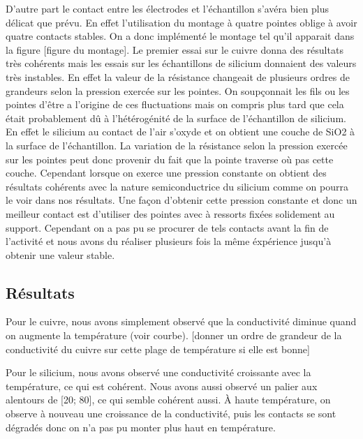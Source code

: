 D'autre part le contact entre les électrodes et l'échantillon s'avéra bien plus délicat que prévu. 
En effet l'utilisation du montage à quatre pointes oblige à avoir quatre contacts stables. On a donc implémenté 
le montage tel qu'il apparait dans la figure [figure du montage]. Le premier essai sur le cuivre donna des résultats 
très cohérents mais les essais sur les échantillons de silicium donnaient des valeurs très instables. 
En effet la valeur de la résistance changeait de plusieurs ordres de grandeurs selon la pression exercée sur les 
pointes. On soupçonnait les fils ou les pointes d'être a l'origine de ces fluctuations 
mais on compris plus tard que cela était probablement dû à l'hétérogénité de la surface de l'échantillon de silicium. 
En effet le silicium au contact de l'air s'oxyde et on obtient une couche de SiO2 à la surface de l'échantillon. 
La variation de la résistance selon la pression exercée sur les pointes peut donc provenir du fait que la pointe 
traverse où pas cette couche. Cependant lorsque on exerce une pression constante on obtient des résultats cohérents avec la nature semiconductrice du silicium comme on pourra le voir dans nos résultats. Une façon d'obtenir cette pression constante et donc un meilleur contact est d'utiliser des pointes avec à ressorts fixées solidement au support. Cependant on a pas pu se procurer de tels contacts avant la fin de l'activité et nous avons du réaliser plusieurs fois la même éxpérience jusqu'à obtenir une valeur stable.


\subsection{Résultats}
Pour le cuivre, nous avons simplement observé que la conductivité diminue quand on augmente la température (voir courbe).
[donner un ordre de grandeur de la conductivité du cuivre sur cette plage de température si elle est bonne]


Pour le silicium, nous avons observé une conductivité croissante avec la température, ce qui est cohérent. Nous avons aussi observé un palier aux alentours de [20\celsius{}; 80\celsius{}], ce qui semble cohérent aussi.
À haute température, on observe à nouveau une croissance de la conductivité, 
puis les contacts se sont dégradés donc on n'a pas pu monter plus haut en température.


